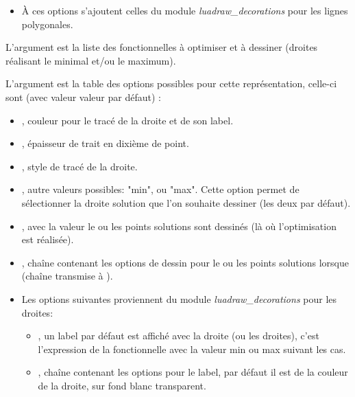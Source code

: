 \begin{itemize}
\begin{itemize}
        \item À ces options s'ajoutent celles du module \emph{luadraw\_decorations} pour les lignes polygonales.
    \end{itemize}
    
    L'argument  est la liste des fonctionnelles à optimiser et à dessiner (droites réalisant le minimal et/ou le maximum).
    
    L'argument  est la table des options possibles pour cette représentation, celle-ci sont (avec valeur valeur par défaut) :
    \begin{itemize}
        \item {}, couleur pour le tracé de la droite et de son label.

        \item {}, épaisseur de trait en dixième de point.

        \item {}, style de tracé de la droite.

        \item {}, autre valeurs possibles: "min", ou "max". Cette option permet de sélectionner la droite solution que l'on souhaite dessiner (les deux par défaut).

        \item {}, avec la valeur \true le ou les points solutions sont dessinés (là où l'optimisation est réalisée).

        \item {}, chaîne contenant les options de dessin pour le ou les points solutions lorsque  (chaîne transmise à \drawcmd).
        
        \item Les options suivantes proviennent du module \emph{luadraw\_decorations} pour les droites:
            \begin{itemize}
                \item {}, un label par défaut est affiché avec la droite (ou les droites), c'est l'expression de la fonctionnelle avec la valeur min ou max suivant les cas.

                \item {}, chaîne contenant les options pour le label, par défaut il est de la couleur de la droite, sur fond blanc transparent.
                

\end{itemize}
\end{itemize}
\end{itemize}
